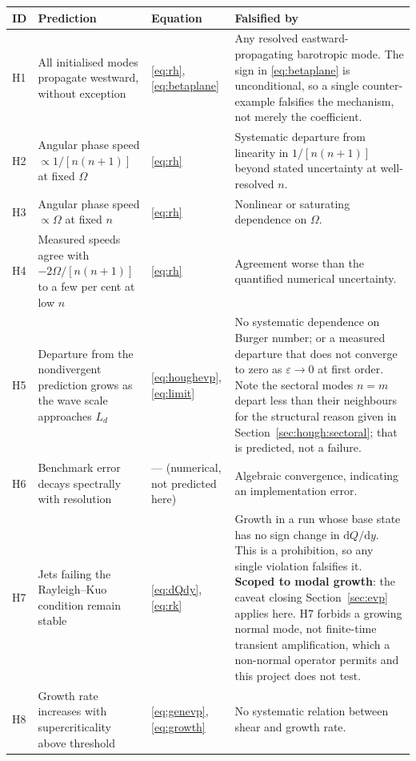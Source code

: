 \documentclass[11pt,a4paper]{article}
\newcommand{\dd}{\mathrm{d}}
\begin{document}
\begin{longtable}{@{}p{}p{}p{}p{}@{}}
\toprule
\textbf{ID} & \textbf{Prediction} & \textbf{Equation} & \textbf{Falsified by} \\
\midrule
\endhead
H1 & All initialised modes propagate westward, without exception
   & \eqref{eq:rh}, \eqref{eq:betaplane}
   & Any resolved eastward-propagating barotropic mode. The sign in
     \eqref{eq:betaplane} is unconditional, so a single counter-example
     falsifies the mechanism, not merely the coefficient. \\
H2 & Angular phase speed $\propto 1/[n(n+1)]$ at fixed $\Omega$
   & \eqref{eq:rh}
   & Systematic departure from linearity in $1/[n(n+1)]$ beyond stated
     uncertainty at well-resolved $n$. \\
H3 & Angular phase speed $\propto \Omega$ at fixed $n$
   & \eqref{eq:rh}
   & Nonlinear or saturating dependence on $\Omega$. \\
H4 & Measured speeds agree with $-2\Omega/[n(n+1)]$ to a few per cent at low $n$
   & \eqref{eq:rh}
   & Agreement worse than the quantified numerical uncertainty. \\
H5 & Departure from the nondivergent prediction grows as the wave scale
     approaches $L_d$
   & \eqref{eq:houghevp}, \eqref{eq:limit}
   & No systematic dependence on Burger number; or a measured departure that
     does not converge to zero as $\varepsilon\to0$ at first order. Note the
     sectoral modes $n = m$ depart less than their neighbours for the
     structural reason given in
     Section~\ref{sec:hough:sectoral}; that is predicted, not a failure. \\
H6 & Benchmark error decays spectrally with resolution
   & --- (numerical, not predicted here)
   & Algebraic convergence, indicating an implementation error. \\
H7 & Jets failing the Rayleigh--Kuo condition remain stable
   & \eqref{eq:dQdy}, \eqref{eq:rk}
   & Growth in a run whose base state has no sign change in $\dd Q/\dd y$.
     This is a prohibition, so any single violation falsifies it.
     \textbf{Scoped to modal growth}: the caveat closing
     Section~\ref{sec:evp} applies here. H7 forbids a growing normal mode,
     not finite-time transient amplification, which a non-normal operator
     permits and this project does not test. \\
H8 & Growth rate increases with supercriticality above threshold
   & \eqref{eq:genevp}, \eqref{eq:growth}
   & No systematic relation between shear and growth rate. \\

\end{longtable}
\end{document}
